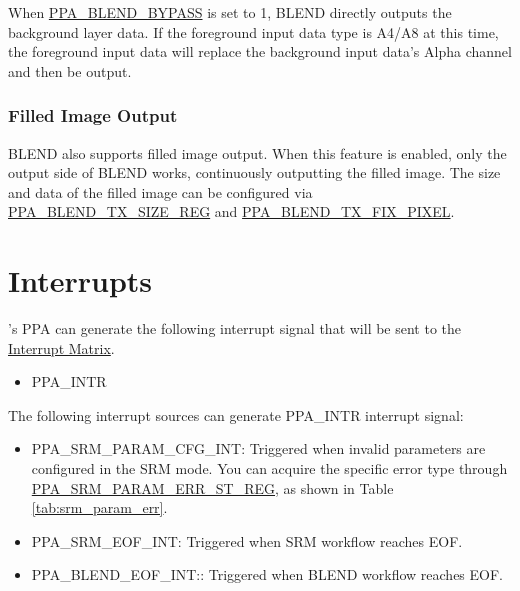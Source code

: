 \documentclass[main\_\_EN.tex]{subfiles}
\begin{document}
When \hyperref[fielddesc:PPABLENDBYPASS]{PPA\_BLEND\_BYPASS} is set to 1, BLEND directly outputs the background layer data. If the foreground input data type is A4/A8 at this time, the foreground input data will replace the background input data's Alpha channel and then be output.

\subsubsection{Filled Image Output}
BLEND also supports filled image output. When this feature is enabled, only the output side of BLEND works, continuously outputting the filled image. The size and data of the filled image can be configured via \hyperref[regdesc:PPABLENDTXSIZEREG]{PPA\_BLEND\_TX\_SIZE\_REG} and \hyperref[fielddesc:PPABLENDTXFIXPIXEL]{PPA\_BLEND\_TX\_FIX\_PIXEL}.


\section{Interrupts}


\chipname{}'s PPA can generate the following interrupt signal that will be sent to the \hyperref[mod:intmtrx]{Interrupt Matrix}.

    \begin{itemize}
        \item PPA\_INTR
    \end{itemize}

The following interrupt sources can generate PPA\_INTR interrupt signal:

\begin{itemize}
    \item \label{int:PPASRMPARAMCFGERR}PPA\_SRM\_PARAM\_CFG\_INT: Triggered when invalid parameters are configured in the SRM mode. You can acquire the specific error type through \hyperref[regdesc:PPASRMPARAMERRSTREG]{PPA\_SRM\_PARAM\_ERR\_ST\_REG}, as shown in Table \ref{tab:srm_param_err}.
    \item \label{int:PPASRMEOF}PPA\_SRM\_EOF\_INT: Triggered when SRM workflow reaches EOF.
    \item \label{int:PPABLENDEOF}PPA\_BLEND\_EOF\_INT:: Triggered when BLEND workflow reaches EOF.
\end{itemize}
\end{document}
